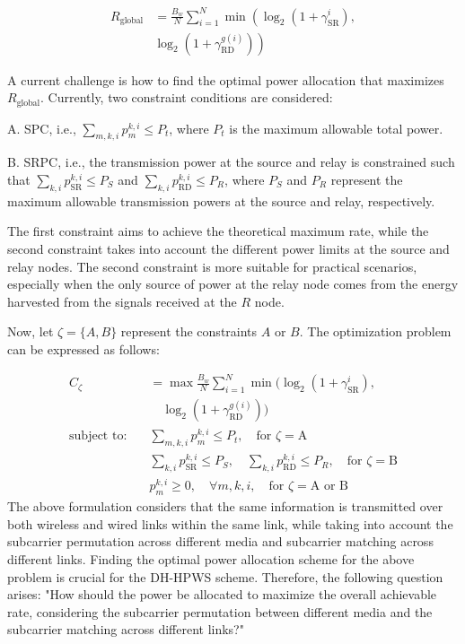 \documentclass[lettersize,journal]{IEEEtran}
\begin{document}
	\begin{equation}
		\begin{aligned}
			R_{\text{global}} &= \frac{B_w}{N} \sum\limits_{i=1}^N \min \left( \log_2 \left( 1 + \gamma_{\text{SR}}^i \right), \right. \\
			& \left. \log_2 \left( 1 + \gamma_{\text{RD}}^{g(i)} \right) \right)
		\end{aligned}
		\label{eq:rate}
	\end{equation}
	
	
	A current challenge is how to find the optimal power allocation that maximizes \( R_{\text{global}} \). Currently, two constraint conditions are considered:
	
	A.  SPC, i.e., \(\sum\limits_{m,k,i} {p_m^{k,i}}  \le {P_t}\), where \( P_{t} \) is the maximum allowable total power.
	
	B. SRPC, i.e., the transmission power at the source and relay is constrained such that \( \sum\limits_{k,i} p_{\text{SR}}^{k,i} \leq P_S \) and \( \sum\limits_{k,i} p_{\text{RD}}^{k,i} \leq P_R \), where \( P_S \) and \( P_R \) represent the maximum allowable transmission powers at the source and relay, respectively.
	
	The first constraint aims to achieve the theoretical maximum rate, while the second constraint takes into account the different power limits at the source and relay nodes. The second constraint is more suitable for practical scenarios, especially when the only source of power at the relay node comes from the energy harvested from the signals received at the \( R \) node.
	
	Now, let \( \zeta = \{A, B\} \) represent the constraints \( A \) or \( B \). The optimization problem can be expressed as follows:
	
	\begin{equation}
		\begin{aligned}
			C_\zeta &= \max \frac{B_w}{N} \sum\limits_{i=1}^N \min \Bigg( \log_2 \left( 1 + \gamma_{\text{SR}}^i \right), \\
			& \quad \log_2 \left( 1 + \gamma_{\text{RD}}^{g(i)} \right) \Bigg) \\
			\text{subject to:} \quad & \sum\limits_{m,k,i} p_m^{k,i} \leq P_t, \quad \text{for } \zeta = \text{A} \\
			& \sum\limits_{k,i} p_{\text{SR}}^{k,i} \leq P_S, \quad \sum\limits_{k,i} p_{\text{RD}}^{k,i} \leq P_R, \quad \text{for } \zeta = \text{B} \\
			& p_m^{k,i} \geq 0, \quad \forall m,k,i, \quad \text{for } \zeta = \text{A or B}
		\end{aligned}
	\end{equation}
	The above formulation considers that the same information is transmitted over both wireless and wired links within the same link, while taking into account the subcarrier permutation across different media and subcarrier matching across different links. Finding the optimal power allocation scheme for the above problem is crucial for the DH-HPWS scheme. Therefore, the following question arises: "How should the power be allocated to maximize the overall achievable rate, considering the subcarrier permutation between different media and the subcarrier matching across different links?"
	
\end{document}
